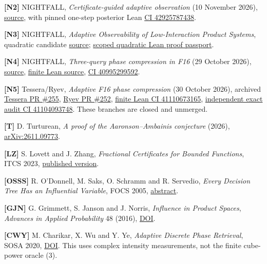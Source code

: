 \documentclass[
  10pt,
]{article}
\begin{document}
\textbf{{[}N2{]}} NIGHTFALL, \emph{Certificate-guided adaptive
observation} (10 November 2026),
\href{https://github.com/d3lefts/d3lefts/blob/main/research/nightfall/formalization/product_space/CERTIFICATE_GUIDED_ADAPTIVE_RECOVERY_20261110.md}{source},
with pinned one-step posterior Lean
\href{https://github.com/d3lefts/d3lefts/actions/runs/42925787438}{CI
42925787438}.

\textbf{{[}N3{]}} NIGHTFALL, \emph{Adaptive Observability of
Low-Interaction Product Systems}, quadratic candidate
\href{https://github.com/d3lefts/d3lefts/blob/main/research/nightfall/observability-publication/PRINCIPAL_PAPER.md}{source};
\href{https://github.com/d3lefts/d3lefts/blob/main/research/nightfall/formalization/observability/QUADRATIC_DISCOVERY_PROOF_PASSPORT.md}{scoped
quadratic Lean proof passport}.

\textbf{{[}N4{]}} NIGHTFALL, \emph{Three-query phase compression in F16}
(29 October 2026),
\href{https://github.com/d3lefts/d3lefts/blob/main/research/nightfall/projects/adaptive-finite-field-decoder-2026-10-29/F16_THREE_QUERY_PHASE_BLOCK_20261029.md}{source},
\href{https://github.com/d3lefts/d3lefts/blob/main/research/nightfall/formalization/phase_block/PhaseBlock.lean}{finite
Lean source},
\href{https://github.com/d3lefts/d3lefts/actions/runs/40995299592}{CI
40995299592}.

\textbf{{[}N5{]}} Tessera/Ryev, \emph{Adaptive F16 phase compression}
(30 October 2026), archived
\href{https://github.com/d3lefts/d3lefts/pull/255}{Tessera PR \#255},
\href{https://github.com/d3lefts/d3lefts/pull/252}{Ryev PR \#252},
\href{https://github.com/d3lefts/d3lefts/actions/runs/41110673165}{finite
Lean CI 41110673165},
\href{https://github.com/d3lefts/d3lefts/actions/runs/41104093748}{independent
exact audit CI 41104093748}. These branches are closed and unmerged.

\textbf{{[}T{]}} D. Turturean, \emph{A proof of the Aaronson--Ambainis
conjecture} (2026),
\href{https://arxiv.org/abs/2611.09773}{arXiv:2611.09773}.

\textbf{{[}LZ{]}} S. Lovett and J. Zhang, \emph{Fractional Certificates
for Bounded Functions}, ITCS 2023,
\href{https://drops.dagstuhl.de/doi/10.4230/LIPIcs.ITCS.2023.84}{published
version}.

\textbf{{[}OSSS{]}} R. O'Donnell, M. Saks, O. Schramm and R. Servedio,
\emph{Every Decision Tree Has an Influential Variable}, FOCS 2005,
\href{https://www.cs.columbia.edu/~rocco/papers/focs05osss.html}{abstract}.

\textbf{{[}GJN{]}} G. Grimmett, S. Janson and J. Norris, \emph{Influence
in Product Spaces}, \emph{Advances in Applied Probability} 48 (2016),
\href{https://doi.org/10.1017/apr.2016.46}{DOI}.

\textbf{{[}CWY{]}} M. Charikar, X. Wu and Y. Ye, \emph{Adaptive Discrete
Phase Retrieval}, SOSA 2020,
\href{https://doi.org/10.1137/1.9781611976014.9}{DOI}. This uses complex
intensity measurements, not the finite cube-power oracle (3).
\end{document}
